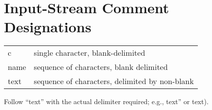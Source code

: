 {\section{Input-Stream Comment Designations}
}

\indent\begin{tabular}{ll}
{}{\setlength{\parsep}{0cm}}c&single character, blank-delimited\\
name&sequence of characters, blank delimited\\
text&sequence of characters, delimited by non-blank\\
\end{tabular}\medskip

\noindent Follow ``text'' with the actual delimiter required; e.g., text''
or text).


